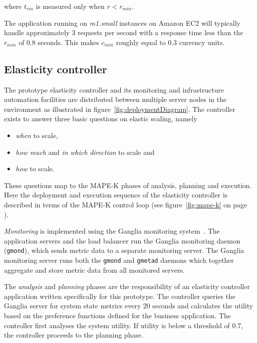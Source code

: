 \documentclass[english]{tktltiki2}
\theoremstyle{definition}
\theoremstyle{remark}
\begin{document}
where $t_{vm}$ is measured only when $r < r_{min}$. 

The application running on \textit{m1.small} instances on Amazon EC2 will
typically handle approximately 3 requests per second with a response time less
than the $r_{min}$ of 0.8 seconds. This makes $c_{min}$
roughly equal to 0.3 currency units.

\subsection{Elasticity controller}

The prototype elasticity controller and its monitoring and infrastructure automation facilities are distributed between multiple server nodes
in the environment as illustrated in figure~\ref{fig:deploymentDiagram}. The controller exists to answer three basic questions on
elastic scaling, namely 
\begin{itemize}
	\item{\textit{when} to scale,}
	\item{\textit{how much} and \textit{in which direction} to scale and}
  	\item{\textit{how} to scale}.
\end{itemize}

These questions map to the MAPE-K phases of analysis, planning and execution.
Here the deployment and execution sequence of the elasticity controller is
described in terms of the MAPE-K control loop (see
figure~\ref{fig:mape-k} on page \pageref{fig:mape-k}).

\textit{Monitoring} is implemented using the Ganglia monitoring
system~\cite{gangliapaper}. The application servers and the load balancer run the
Ganglia monitoring daemon (\texttt{gmond}), which sends metric data to a
separate monitoring server. The Ganglia monitoring server runs both the
\texttt{gmond} and \texttt{gmetad} daemons which together aggregate and store metric
data from all monitored servers. 

The \textit{analysis} and \textit{planning} phases are the responsibility of an
elasticity controller application written specifically for this prototype. The
controller queries the Ganglia server for system state metrics every 20 seconds
and calculates the utility based on the preference functions defined for the
business application. The controller first analyses the system utility. If
utility is below a threshold of 0.7, the controller proceeds to the planning phase.
\end{document}
